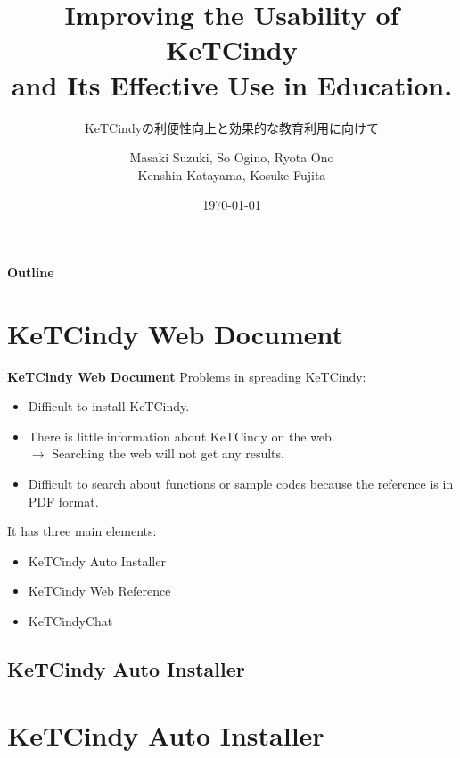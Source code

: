 \documentclass[dvipdfmx, unicode, 169]{beamer}
\title{
  \bfseries Improving the Usability of KeTCindy\\
  and Its Effective Use in Education.
}
\subtitle{
  KeTCindyの利便性向上と効果的な教育利用に向けて
}
\author{
  Masaki Suzuki, So Ogino, Ryota Ono\\
  Kenshin Katayama, Kosuke Fujita
}
\date{\today}
\institute[]{National Institute of Technology, Numazu College}
\begin{document}
\frame{\maketitle}

\begin{frame}[t]{\bfseries Outline}
  \tableofcontents
\end{frame}

\section{KeTCindy Web Document}

\begin{frame}[t]{\bfseries KeTCindy Web Document}
  Problems in spreading KeTCindy:
  \begin{itemize}
    \item Difficult to install KeTCindy.
    \item There is little information about KeTCindy on the web.\\
          $\rightarrow$ Searching the web will not get any results.
    \item Difficult to search about functions or sample codes
          because the reference is in PDF format.
  \end{itemize}
  It has three main elements:
  \begin{itemize}
    \item KeTCindy Auto Installer
    \item KeTCindy Web Reference
    \item KeTCindyChat
  \end{itemize}
\end{frame}

\subsection{KeTCindy Auto Installer}
\section*{KeTCindy Auto Installer}
\end{document}
